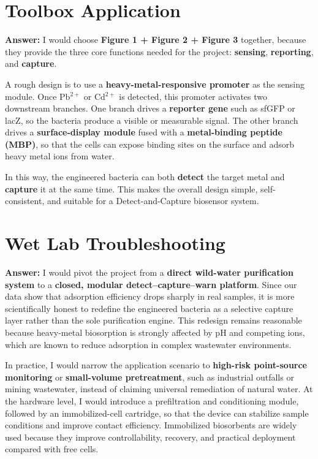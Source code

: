 \documentclass[12pt,a4paper]{article}
\begin{document}
\maketitle

\section{Toolbox Application}
\noindent\textbf{Answer:} I would choose \textbf{Figure 1 + Figure 2 + Figure 3} together, because they provide the three core functions needed for the project: \textbf{sensing}, \textbf{reporting}, and \textbf{capture}.

A rough design is to use a \textbf{heavy-metal-responsive promoter} as the sensing module. Once Pb$^{2+}$ or Cd$^{2+}$ is detected, this promoter activates two downstream branches. One branch drives a \textbf{reporter gene} such as sfGFP or lacZ, so the bacteria produce a visible or measurable signal. The other branch drives a \textbf{surface-display module} fused with a \textbf{metal-binding peptide (MBP)}, so that the cells can expose binding sites on the surface and adsorb heavy metal ions from water.

In this way, the engineered bacteria can both \textbf{detect} the target metal and \textbf{capture} it at the same time. This makes the overall design simple, self-consistent, and suitable for a Detect-and-Capture biosensor system.

\section{Wet Lab Troubleshooting}
\noindent\textbf{Answer:}  
I would pivot the project from a \textbf{direct wild-water purification system} to a \textbf{closed, modular detect--capture--warn platform}. Since our data show that adsorption efficiency drops sharply in real samples, it is more scientifically honest to redefine the engineered bacteria as a selective capture layer rather than the sole purification engine. This redesign remains reasonable because heavy-metal biosorption is strongly affected by pH and competing ions, which are known to reduce adsorption in complex wastewater environments.  

In practice, I would narrow the application scenario to \textbf{high-risk point-source monitoring} or \textbf{small-volume pretreatment}, such as industrial outfalls or mining wastewater, instead of claiming universal remediation of natural water. At the hardware level, I would introduce a prefiltration and conditioning module, followed by an immobilized-cell cartridge, so that the device can stabilize sample conditions and improve contact efficiency. Immobilized biosorbents are widely used because they improve controllability, recovery, and practical deployment compared with free cells.
\end{document}
